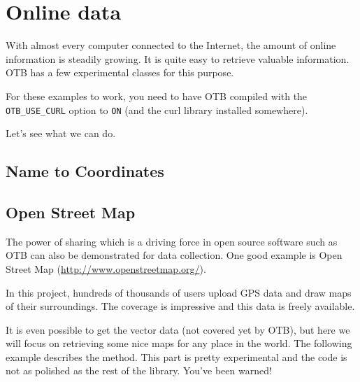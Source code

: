 \chapter{Online data}\label{sec:Online}

With almost every computer connected to the Internet, the amount of
online information is steadily growing. It is quite easy to retrieve
valuable information. OTB has a few experimental classes for this
purpose.

For these examples to work, you need to have OTB compiled with the
\texttt{OTB\_USE\_CURL} option to \texttt{ON} (and the curl library
installed somewhere).

Let's see what we can do.

\section{Name to Coordinates}
\label{sec:NamesToCoordinates}



\section{Open Street Map}
\label{sec:OpenStreetMap}

The power of sharing which is a driving force in open source software such
as OTB can also be demonstrated for data collection. One good example is
Open Street Map (\url{http://www.openstreetmap.org/}).

In this project, hundreds of thousands of users upload GPS data and draw maps of their
surroundings. The coverage is impressive and this data is freely available.

It is even possible to get the vector data (not covered yet by OTB), but
here we will focus on retrieving some nice maps for any place in the world. The following
example describes the method. This part is pretty experimental and the code is
not as polished as the rest of the library. You've been warned!



